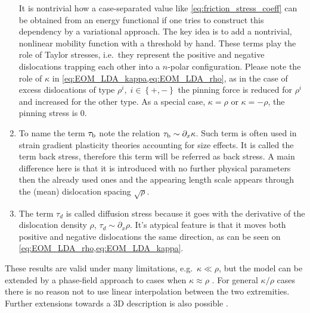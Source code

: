 \begin{enumerate}
It is nontrivial how a case-separated value like \cref{eq:friction_stress_coeff} can be obtained from an energy functional if one tries to construct this dependency by a variational approach. The key idea is to add a nontrivial, nonlinear mobility function with a threshold by hand. These terms play the role of Taylor stresses, i.e.\ they represent the positive and negative dislocations trapping each other into a $n$-polar configuration. Please note the role of $\kappa$ in \cref{eq:EOM_LDA_kappa,eq:EOM_LDA_rho}, as in the case of excess dislocations of type ${\rho ^i},\;i \in \left\{ { + , - } \right\}$ the pinning force is reduced for $\rho^i$ and increased for the other type. As a special case, $\kappa  = \rho $ or $\kappa  = -\rho $, the pinning stress is $0$.
\item 
To name the term $\tau_{\rm{b}}$ note the relation ${\tau _{\rm{b}}} \sim {\partial _x}\kappa $. Such term is often used in strain gradient plasticity theories accounting for size effects. It is called the term back stress, therefore this term will be referred as back stress. A main difference here is that it is introduced with no further physical parameters then the already used ones and the appearing length scale appears through the (mean) dislocation spacing $\sqrt{\rho}$.
\item
The term $\tau_d$ is called diffusion stress because it goes with the derivative of the dislocation density $\rho$, ${\tau _d} \sim {\partial _x}\rho $. It's atypical feature is that it moves both positive and negative dislocations the same direction, as can be seen on \cref{eq:EOM_LDA_rho,eq:EOM_LDA_kappa}.
\end{enumerate}

These results are valid under many limitations, e.g.\ $\kappa  \ll \rho $, but the model can be extended by a phase-field approach to cases when $\kappa  \approx \rho $ \cite{PhysRevLett.114.015503}. For general $\kappa / \rho$ cases there is no reason not to use linear interpolation between the two extremities. Further extensions towards a 3D description is also possible \cite{PhysRevB.92.174120}. 

